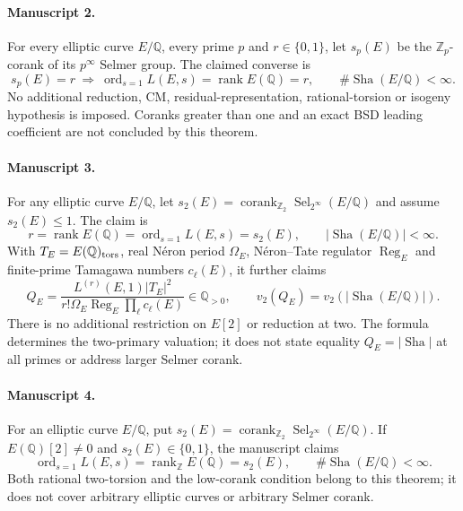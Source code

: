 \documentclass[11pt]{article}
\begin{document}
\paragraph{Manuscript 2.}
For every elliptic curve $E/\mathbb Q$, every prime $p$ and $r\in\{0,1\}$, let $s_p(E)$ be the $\mathbb Z_p$-corank of its $p^{\infty}$ Selmer group. The claimed converse is
\[
 s_p(E)=r\ \Longrightarrow\ \operatorname{ord}_{s=1}L(E,s)=\operatorname{rank}E(\mathbb Q)=r,
 \qquad\#\operatorname{Sha}(E/\mathbb Q)<\infty.
\]
No additional reduction, CM, residual-representation, rational-torsion or isogeny hypothesis is imposed. Coranks greater than one and an exact BSD leading coefficient are not concluded by this theorem.

\paragraph{Manuscript 3.}
For any elliptic curve $E/\mathbb Q$, let $s_2(E)=\operatorname{corank}_{\mathbb Z_2}\operatorname{Sel}_{2^{\infty}}(E/\mathbb Q)$ and assume $s_2(E)\le1$. The claim is
\[
 r=\operatorname{rank}E(\mathbb Q)=\operatorname{ord}_{s=1}L(E,s)=s_2(E),
 \qquad |\operatorname{Sha}(E/\mathbb Q)|<\infty.
\]
With $T_E=E(\mathbb Q)_{\rm tors}$, real N\'eron period $\Omega_E$, N\'eron--Tate regulator $\operatorname{Reg}_E$ and finite-prime Tamagawa numbers $c_{\ell}(E)$, it further claims
\[
 Q_E=\frac{L^{(r)}(E,1)|T_E|^2}{r!\Omega_E\operatorname{Reg}_E\prod_{\ell} c_{\ell}(E)}
 \in\mathbb Q_{>0},\qquad v_2(Q_E)=v_2(|\operatorname{Sha}(E/\mathbb Q)|).
\]
There is no additional restriction on $E[2]$ or reduction at two. The formula determines the two-primary valuation; it does not state equality $Q_E=|\operatorname{Sha}|$ at all primes or address larger Selmer corank.

\paragraph{Manuscript 4.}
For an elliptic curve $E/\mathbb Q$, put $s_2(E)=\operatorname{corank}_{\mathbb Z_2}\operatorname{Sel}_{2^{\infty}}(E/\mathbb Q)$. If $E(\mathbb Q)[2]\ne0$ and $s_2(E)\in\{0,1\}$, the manuscript claims
\[
 \operatorname{ord}_{s=1}L(E,s)=\operatorname{rank}_{\mathbb Z}E(\mathbb Q)=s_2(E),\qquad
 \#\operatorname{Sha}(E/\mathbb Q)<\infty.
\]
Both rational two-torsion and the low-corank condition belong to this theorem; it does not cover arbitrary elliptic curves or arbitrary Selmer corank.
\end{document}
